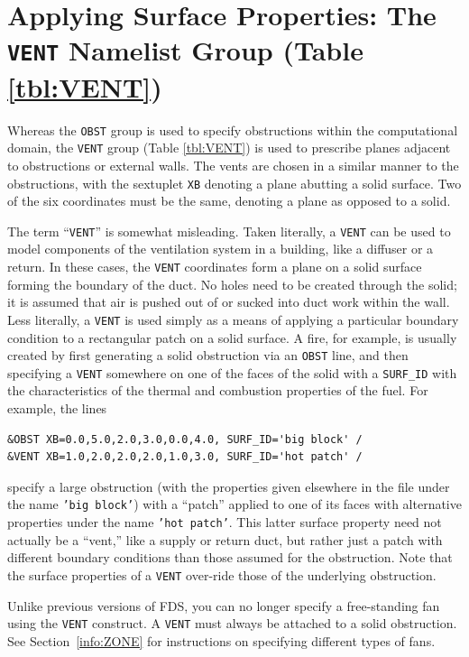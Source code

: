\documentclass[11pt]{book}
\newcommand{\ct}{\tt\small}
\begin{document}
\section{Applying Surface Properties: The \texorpdfstring{{\tt VENT}}{VENT} Namelist Group (Table \ref{tbl:VENT})}
\label{info:VENT} 

Whereas the {\ct OBST} group is used to specify obstructions within the
computational domain, the {\ct VENT} group (Table \ref{tbl:VENT}) is used to prescribe planes
adjacent to obstructions or external walls. The vents are chosen in a
similar manner to the obstructions, with the sextuplet {\ct XB}
denoting a plane abutting a solid surface. Two of the six coordinates must
be the same, denoting a plane as opposed to a solid.

The term ``{\ct VENT}'' is somewhat misleading. Taken literally, a
{\ct VENT} can be used to model components of the ventilation system in
a building, like a diffuser or a return.
In these cases, the {\ct VENT} coordinates form a plane on a
solid surface forming the boundary of the duct.
No holes need to be created through the solid; it is
assumed that air is pushed out of or sucked into duct work within the
wall. Less literally, a {\ct VENT} is used simply as a means of applying
a particular boundary condition to a rectangular patch on a solid surface.
A fire, for example, is usually created by first generating a solid
obstruction via an {\ct OBST} line, and then specifying a {\ct VENT}
somewhere on one of the faces of the solid with a {\ct SURF\_ID}
with the characteristics of the thermal and combustion properties of the fuel.
For example, the lines

\footnotesize
\begin{verbatim}
&OBST XB=0.0,5.0,2.0,3.0,0.0,4.0, SURF_ID='big block' /
&VENT XB=1.0,2.0,2.0,2.0,1.0,3.0, SURF_ID='hot patch' /
\end{verbatim} \normalsize

\noindent
specify a large obstruction (with the properties given elsewhere in the file under the name {\ct 'big block'}) with
a ``patch'' applied to one of its faces with alternative properties under the name {\ct 'hot patch'}. This latter
surface property need not actually be a ``vent,'' like a supply or return duct, but rather just a patch with different boundary
conditions than those assumed for the obstruction. Note that the surface properties of a {\ct VENT} over-ride those of the
underlying obstruction.

\begin{warning}
Unlike previous versions of FDS, you can no longer specify a free-standing fan using the {\ct VENT}
construct. A {\ct VENT} must always be attached to a solid obstruction. See
Section~\ref{info:ZONE} for instructions on specifying different types of fans.
\end{warning}
\end{document}
